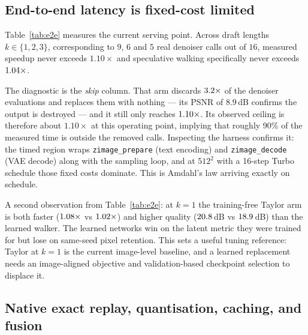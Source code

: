\documentclass[11pt,a4paper]{article}
\begin{document}
\subsection{End-to-end latency is fixed-cost limited}
\label{sec:e2e}

Table~\ref{tab:e2e} measures the current serving point. Across draft lengths $k \in
\{1,2,3\}$, corresponding to $9$, $6$ and $5$ real denoiser calls out of $16$,
measured speedup never exceeds $1.10\times$ and speculative walking specifically
never exceeds $1.04\times$.

\begin{table}[ht]
\centering

\caption{Draft-length ablation at $512^2$, 16 steps, 5 prompts per cell after
warm-up exclusion. ``call red.'' is the reduction in denoiser evaluations;
speedup is measured wall clock. \emph{skip} performs no correction at all and
therefore bounds what any drafting scheme can achieve in this harness.}
\label{tab:e2e}
\end{table}

The diagnostic is the \emph{skip} column. That arm discards
$3.2\times$ of the denoiser evaluations and replaces them with
nothing --- its PSNR of $8.9$\,dB confirms the output is destroyed --- and it still
only reaches $1.10\times$. Its observed ceiling is therefore
about $1.10\times$ at this operating point, implying that roughly 90\% of the
measured time is outside the removed calls. Inspecting the harness confirms it: the timed
region wraps \texttt{zimage\_prepare} (text encoding) and \texttt{zimage\_decode}
(VAE decode) along with the sampling loop, and at $512^2$ with a 16-step Turbo
schedule those fixed costs dominate. This is Amdahl's law
\citep{amdahl1967validity} arriving exactly on schedule.

A second observation from Table~\ref{tab:e2e}: at $k=1$ the training-free Taylor
arm is both faster ($1.08\times$ vs $1.02\times$) and
higher quality ($20.8$\,dB vs $18.9$\,dB) than the learned
walker. The learned networks win on the latent metric they were trained for but
lose on same-seed pixel retention. This sets a useful tuning reference: Taylor
at $k=1$ is the current image-level baseline, and a learned replacement needs an
image-aligned objective and validation-based checkpoint selection to displace it.

\subsection{Native exact replay, quantisation, caching, and fusion}
\label{sec:native-ablation}
\end{document}
